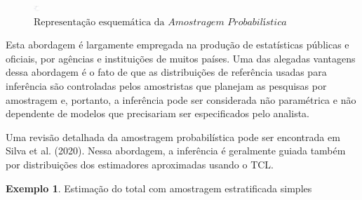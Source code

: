 \documentclass[
  12pt,
  brazilian,
]{book}
\theoremstyle{definition}
\theoremstyle{definition}
\newtheorem{example}{Exemplo}[chapter]
\theoremstyle{definition}
\theoremstyle{definition}
\theoremstyle{remark}
\begin{document}
\begin{figure}

{\centering \includegraphics[width=8,75in]{Figuras/Figura2.2} 

}

\caption{$\text{Representação esquemática da }\textit{Amostragem Probabilística}$}\label{fig:modamo}
\end{figure}

Esta abordagem é largamente empregada na produção de estatísticas públicas e
oficiais, por agências e instituições de muitos países. Uma das alegadas vantagens dessa abordagem é o fato de que as distribuições de referência usadas para inferência são controladas pelos amostristas que planejam as pesquisas por
amostragem e, portanto, a inferência pode ser considerada não paramétrica e não
dependente de modelos que precisariam ser especificados pelo analista.

Uma revisão detalhada da amostragem probabilística pode ser encontrada em Silva et al. (2020). Nessa abordagem, a inferência é geralmente guiada também por distribuições dos estimadores aproximadas usando o TCL.

\begin{example}
\protect\hypertarget{exm:aestot}{}{\label{exm:aestot} }Estimação do total com amostragem estratificada simples
\end{example}
\end{document}
